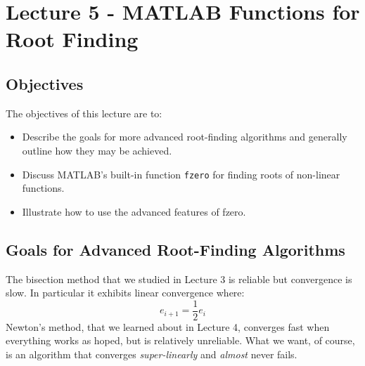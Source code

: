 \chapter{Lecture 5 - MATLAB Functions for Root Finding}
\label{ch:lec5n}
\section{Objectives}
The objectives of this lecture are to:
\begin{itemize}
\item Describe the goals for more advanced root-finding algorithms and generally outline how they may be achieved.
\item Discuss MATLAB's built-in function \lstinline[style=myMatlab]{fzero} for finding roots of non-linear functions.
\item Illustrate how to use the advanced features of fzero.
\end{itemize}
\setcounter{lstannotation}{0}

\section{Goals for Advanced Root-Finding Algorithms}

The bisection method that we studied in Lecture 3 is reliable but convergence is slow.  In particular it exhibits linear convergence where:
\begin{equation}
e_{i+1} = \frac{1}{2}e_{i}
\end{equation}
Newton's method, that we learned about in Lecture 4, converges fast when everything works as hoped, but is relatively unreliable.  What we want, of course, is an algorithm that converges \emph{super-linearly} and \emph{almost} never fails.

